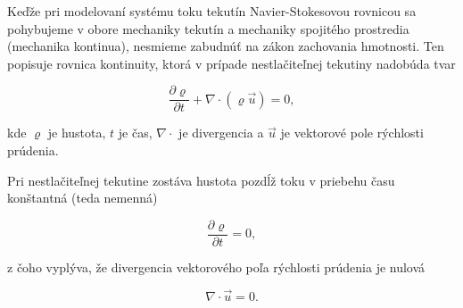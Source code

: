 \documentclass[]{tukediphc}
\begin{document}
Keďže pri modelovaní systému toku tekutín Navier-Stokesovou rovnicou sa pohybujeme v obore mechaniky tekutín a mechaniky spojitého prostredia (mechanika kontinua), nesmieme zabudnúť na zákon zachovania hmotnosti. Ten popisuje rovnica kontinuity, ktorá v prípade nestlačiteľnej tekutiny nadobúda tvar

\begin{equation}
\frac{\partial \varrho}{\partial t} + \nabla \cdot (\varrho \vec{u}) = 0, 
\end{equation}

kde $\varrho$  je hustota, $t$ je čas, $\nabla \cdot$ je divergencia a $\vec{u}$ je vektorové pole rýchlosti prúdenia.

Pri nestlačiteľnej tekutine zostáva hustota pozdĺž toku v priebehu času konštantná (teda nemenná)

\begin{equation}
\frac{\partial \varrho}{\partial t} = 0, 
\end{equation}

z čoho vyplýva, že divergencia vektorového poľa rýchlosti prúdenia je nulová

\begin{equation}
\nabla \cdot \vec{u} = 0.
\end{equation}


%
%
%
%
%
\end{document}
